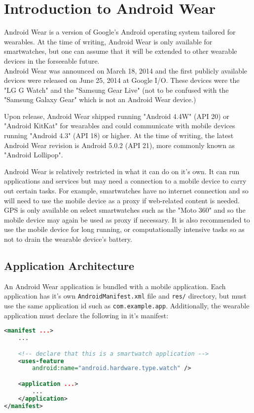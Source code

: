 \section{Introduction to Android Wear}

Android Wear is a version of Google's Android operating system tailored for
wearables. At the time of writing, Android Wear is only available for
smartwatches, but one can assume that it will be extended to other wearable
devices in the forseeable future.\\
Android Wear was announced on March 18, 2014 and the first publicly available
devices were released on June 25, 2014 at Google I/O. These devices were the
"LG G Watch" and the "Samsung Gear Live" (not to be confused with the
"Samsung Galaxy Gear" which is not an Android Wear device.)

Upon release, Android Wear shipped running "Android 4.4W" (API 20) or "Android
KitKat" for wearables and could communicate with mobile devices running
"Android 4.3" (API 18) or higher. At the time of writing, the latest Android
Wear revision is Android 5.0.2 (API 21), more commonly known as "Android
Lollipop".

Android Wear is relatively restricted in what it can do on it's own. It can run
applications and services but may need a connection to a mobile device to carry
out certain tasks. For example, smartwatches have no internet connection and so
will need to use the mobile device as a proxy if web-related content is needed.
GPS is only available on select smartwatches such as the "Moto 360" and so the
mobile device may again be used as proxy if necessary.
It is also recommended to use the mobile device for long running, or
computationally intensive tasks so as not to drain the wearable device's
battery.

\subsection{Application Architecture}
An Android Wear application is bundled with a mobile application. Each
application has it's own \texttt{AndroidManifest.xml} file and
\texttt{res/} directory, but must use the same application id such as
\texttt{com.example.app}. Additionally, the wearable application must declare
the following in it's manifest:
\begin{lstlisting}[language=XML]
<manifest ...>
    ...

    <!-- declare that this is a smartwatch application -->
    <uses-feature
        android:name="android.hardware.type.watch" />

    <application ...>
        ...
    </application>
</manifest>
\end{lstlisting}

